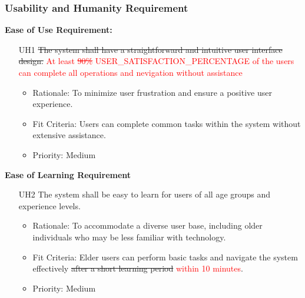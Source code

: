 \documentclass[12pt]{article}
\begin{document}
\subsubsection{Usability and Humanity Requirement}
\textbf{Ease of Use Requirement:}
\begin{itemize}
    \item[UH1] \sout{The system shall have a straightforward and intuitive user interface design.}
    \textcolor{red}{At least \sout{90\%} \textcolor{red}{USER\_SATISFACTION\_PERCENTAGE} of the users can complete all operations and nevigation without assistance} \label{UH1}
    \begin{itemize}
        \item Rationale: To minimize user frustration and ensure a positive user experience.
        \item Fit Criteria: Users can complete common tasks within the system without extensive assistance.
        \item Priority: Medium
    \end{itemize}
\end{itemize}
\textbf{Ease of Learning Requirement}
\begin{itemize}
    \item[UH2] The system shall be easy to learn for users of all age groups and experience levels. \label{UH2}
    \begin{itemize}
        \item Rationale: To accommodate a diverse user base, including older individuals who may be less familiar with technology.
        \item Fit Criteria: Elder users can perform basic tasks and navigate the system effectively \sout{after a short learning period}
        \textcolor{red}{within 10 minutes}.
        \item Priority: Medium
    \end{itemize}
\end{itemize}
\end{document}
